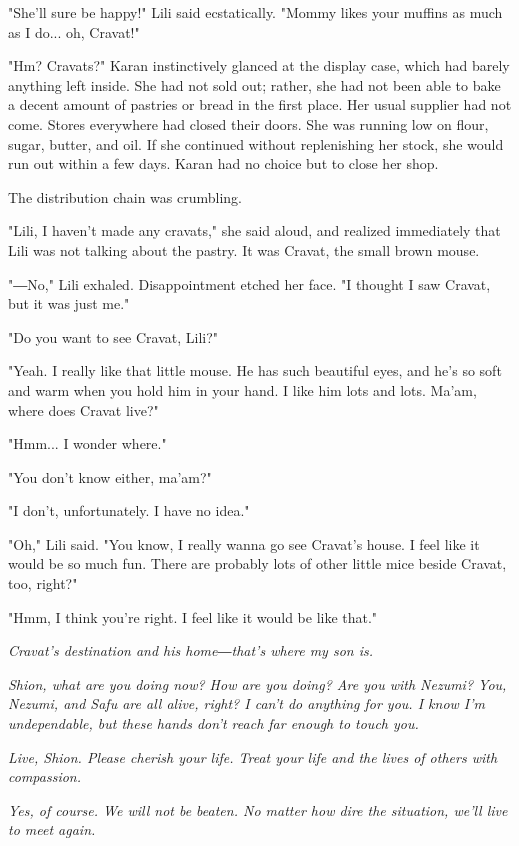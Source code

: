 "She'll sure be happy!" Lili said ecstatically. "Mommy likes your
muffins as much as I do... oh, Cravat!"

"Hm? Cravats?" Karan instinctively glanced at the display case, which
had barely anything left inside. She had not sold out; rather, she had
not been able to bake a decent amount of pastries or bread in the first
place. Her usual supplier had not come. Stores everywhere had closed
their doors. She was running low on flour, sugar, butter, and oil. If
she continued without replenishing her stock, she would run out within a
few days. Karan had no choice but to close her shop.

The distribution chain was crumbling.

"Lili, I haven't made any cravats," she said aloud, and realized
immediately that Lili was not talking about the pastry. It was Cravat,
the small brown mouse.

"―No," Lili exhaled. Disappointment etched her face. "I thought I saw
Cravat, but it was just me."

"Do you want to see Cravat, Lili?"

"Yeah. I really like that little mouse. He has such beautiful eyes, and
he's so soft and warm when you hold him in your hand. I like him lots
and lots. Ma'am, where does Cravat live?"

"Hmm... I wonder where."

"You don't know either, ma'am?"

"I don't, unfortunately. I have no idea."

"Oh," Lili said. "You know, I really wanna go see Cravat's house. I feel
like it would be so much fun. There are probably lots of other little
mice beside Cravat, too, right?"

"Hmm, I think you're right. I feel like it would be like that."

\emph{Cravat's destination and his home―that's where my son is.}

\emph{Shion, what are you doing now? How are you doing? Are you with Nezumi?
	You, Nezumi, and Safu are all alive, right? I can't do anything for you.
	I know I'm undependable, but these hands don't reach far enough to touch
	you.}

\emph{Live, Shion. Please cherish your life. Treat your life and the lives of
	others with compassion.}


\emph{Yes, of course. We will not be beaten. No matter how dire the situation,
	we'll live to meet again.}

